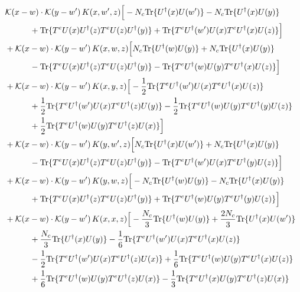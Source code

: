 \documentclass[10pt]{article}
\numberwithin{equation}{section}
\begin{document}
\begin{align}
&\mathcal K(x-w)\cdot\mathcal K(y-w')\,K(x,w',z)\Big[-N_c{\rm Tr}\{U^\dagger(x)U(w')\}-N_c{\rm Tr}\{U^\dagger(x)U(y)\}\notag\\
&\quad\quad\quad+{\rm Tr}\{T^eU(x)U^\dagger(z)T^eU(z)U^\dagger(y)\}+{\rm Tr}\{T^eU^\dagger(w')U(x)T^eU^\dagger(x)U(z)\}\Big]\notag\\
&+\mathcal K(x-w)\cdot\mathcal K(y-w')\,K(x,w,z)\Big[N_c{\rm Tr}\{U^\dagger(w)U(y)\}+N_c{\rm Tr}\{U^\dagger(x)U(y)\}\notag\\
&\quad\quad\quad-{\rm Tr}\{T^eU(x)U^\dagger(z)T^eU(z)U^\dagger(y)\}-{\rm Tr}\{T^eU^\dagger(w)U(y)T^eU^\dagger(x)U(z)\}\Big]\notag\\
&+\mathcal K(x-w)\cdot\mathcal K(y-w')\,K(x,y,z)\Big[-\frac{1}{2}{\rm Tr}\{T^eU^\dagger(w')U(x)T^eU^\dagger(x)U(z)\}\notag\\
&\quad\quad\quad+\frac{1}{2}{\rm Tr}\{T^eU^\dagger(w')U(x)T^eU^\dagger(z)U(y)\}-\frac{1}{2}{\rm Tr}\{T^eU^\dagger(w)U(y)T^eU^\dagger(y)U(z)\}\notag\\
&\quad\quad\quad+\frac{1}{2}{\rm Tr}\{T^eU^\dagger(w)U(y)T^eU^\dagger(z)U(x)\}\Big]\notag\\
&+\mathcal K(x-w)\cdot\mathcal K(y-w')\,K(y,w',z)\Big[N_c{\rm Tr}\{U^\dagger(x)U(w')\}+N_c{\rm Tr}\{U^\dagger(x)U(y)\}\notag\\
&\quad\quad\quad-{\rm Tr}\{T^eU(x)U^\dagger(z)T^eU(z)U^\dagger(y)\}-{\rm Tr}\{T^eU^\dagger(w')U(x)T^eU^\dagger(y)U(z)\}\Big]\notag\\
&+\mathcal K(x-w)\cdot\mathcal K(y-w')\,K(y,w,z)\Big[-N_c{\rm Tr}\{U^\dagger(w)U(y)\}-N_c{\rm Tr}\{U^\dagger(x)U(y)\}\notag\\
&\quad\quad\quad+{\rm Tr}\{T^eU(x)U^\dagger(z)T^eU(z)U^\dagger(y)\}+{\rm Tr}\{T^eU^\dagger(w)U(y)T^eU^\dagger(y)U(z)\}\Big]\notag\\
&+\mathcal K(x-w)\cdot\mathcal K(y-w')\,K(x,x,z)\Big[-\frac{N_c}{3}{\rm Tr}\{U^\dagger(w)U(y)\}+\frac{2 N_c}{3}{\rm Tr}\{U^\dagger(x)U(w')\}\notag\\
&\quad\quad\quad+\frac{N_c}{3}{\rm Tr}\{U^\dagger(x)U(y)\}-\frac{1}{6}{\rm Tr}\{T^eU^\dagger(w')U(x)T^eU^\dagger(x)U(z)\}\notag\\
&\quad\quad\quad-\frac{1}{2}{\rm Tr}\{T^eU^\dagger(w')U(x)T^eU^\dagger(z)U(x)\}+\frac{1}{6}{\rm Tr}\{T^eU^\dagger(w)U(y)T^eU^\dagger(x)U(z)\}\notag\\
&\quad\quad\quad+\frac{1}{6}{\rm Tr}\{T^eU^\dagger(w)U(y)T^eU^\dagger(z)U(x)\}-\frac{1}{3}{\rm Tr}\{T^eU^\dagger(x)U(y)T^eU^\dagger(z)U(x)\}\notag\\

\end{align}
\end{document}
